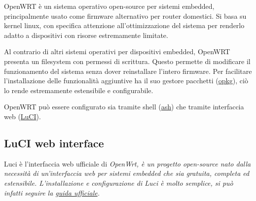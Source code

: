 OpenWRT è un sistema operativo open-source per sistemi embedded, principalmente usato come firmware alternativo per router domestici. Si basa su kernel linux, con specifica attenzione all'ottimizzazione del sistema per renderlo adatto a dispositivi con risorse estremamente limitate.

Al contrario di altri sistemi operativi per dispositivi embedded, OpenWRT presenta un filesystem con permessi di scrittura. Questo permette di modificare il funzionamento del sistema senza dover reinstallare l'intero firmware. Per facilitare l'installazione delle funzionalità aggiuntive ha il suo gestore pacchetti (\href{https://openwrt.org/docs/guide-user/additional-software/opkg}{opkg}), ciò lo rende estremamente estensibile e configurabile.

OpenWRT può essere configurato sia tramite shell (\href{https://en.wikipedia.org/wiki/Almquist_shell}{ash}) che tramite interfaccia web (\href{https://openwrt.org/docs/guide-user/luci/start}{LuCI}).

\subsection{LuCI web interface}

Luci è l'interfaccia web ufficiale di \it{OpenWrt}, è un progetto open-source nato dalla necessità di un'interfaccia web per sistemi embedded che sia gratuita, completa ed estensibile. L'installazione e configurazione di Luci è molto semplice, si può infatti seguire la \href{https://openwrt.org/docs/guide-user/luci/luci.essentials}{guida ufficiale}.


